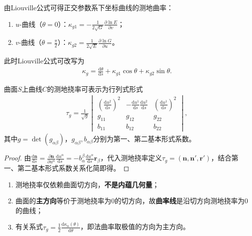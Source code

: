 \documentclass[../../main.tex]{subfiles}%
\begin{document}
\begin{remark}
由Liouville公式可得正交参数系下坐标曲线的测地曲率：
\begin{enumerate}[(1)]
\item $u$-曲线（$\theta=0$）：$\displaystyle\kappa_{g1}=-\frac{1}{2\sqrt{G}}\frac{\partial\ln E}{\partial v}$；
\item $v$-曲线（$\theta=\frac{\pi}{2}$）：$\displaystyle\kappa_{g2}=\frac{1}{2\sqrt{E}}\frac{\partial\ln G}{\partial u}$。
\end{enumerate}
此时Liouville公式可改写为
\begin{align*}
\kappa_g=\frac{\mathrm{d}\theta}{\mathrm{d}s}+\kappa_{g1}\cos\theta+\kappa_{g2}\sin\theta.
\end{align*}
\end{remark}

\begin{proposition}
曲面$S$上曲线$C$的测地挠率可表示为行列式形式
\begin{align}
\tau_g=\frac{1}{\sqrt{g}}
\begin{vmatrix}
\left(\frac{\mathrm{d}u^2}{\mathrm{d}s}\right)^2&-\frac{\mathrm{d}u^1}{\mathrm{d}s}\frac{\mathrm{d}u^2}{\mathrm{d}s}&\left(\frac{\mathrm{d}u^1}{\mathrm{d}s}\right)^2\\
g_{11}&g_{12}&g_{22}\\
b_{11}&b_{12}&b_{22}
\end{vmatrix},\label{eq:taugdet}
\end{align}
其中$g=\det(g_{\alpha\beta})$，$g_{\alpha\beta},b_{\alpha\beta}$分别为第一、第二基本形式系数。
\end{proposition}
\begin{proof}

由$\frac{\mathrm{d}\boldsymbol{n}}{\mathrm{d}s}=\frac{\partial\boldsymbol{n}}{\partial u^\alpha}\frac{\mathrm{d}u^\alpha}{\mathrm{d}s}=-b_\alpha^\beta\frac{\mathrm{d}u^\alpha}{\mathrm{d}s}\boldsymbol{r}_\beta$，代入测地挠率定义$\tau_g=(\boldsymbol{n},\boldsymbol{n}',\boldsymbol{r}')$，结合第一、第二基本形式系数关系化简即得。

\end{proof}

\begin{remark}
\begin{enumerate}[(1)]
\item 测地挠率仅依赖曲面切方向，\textbf{不是内蕴几何量}；
\item 曲面的\textbf{主方向}等价于测地挠率为$0$的切方向，故\textbf{曲率线}是沿切方向测地挠率为$0$的曲线；
\item 有关系式$\displaystyle\tau_g=\frac{1}{2}\frac{\mathrm{d}\kappa_n(\theta)}{\mathrm{d}\theta}$，即法曲率取极值的方向为主方向。
\end{enumerate}
\end{remark}
\end{document}

